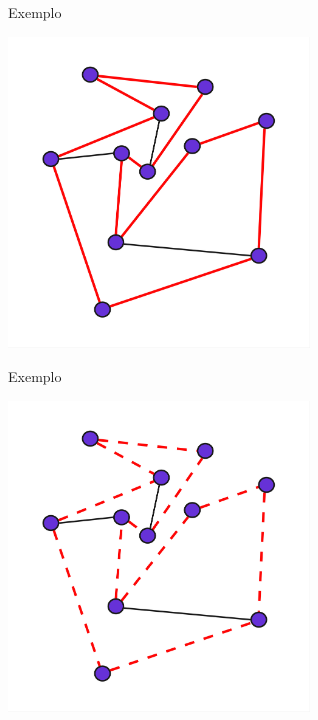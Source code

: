 \begin{frame}{Exemplo}
    \begin{minipage}{\linewidth}
        \centering
        \includegraphics[width=8cm]{images/proof_2_1.jpg}
    \end{minipage}
\end{frame}

\begin{frame}{Exemplo}
    \begin{minipage}{\linewidth}
        \centering
        \includegraphics[width=8cm]{images/proof_2_2.jpg}
    \end{minipage}
\end{frame}

